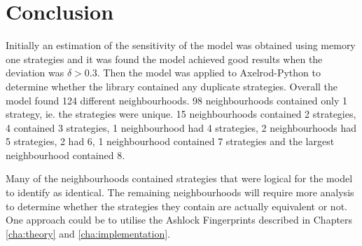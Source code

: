 \section{Conclusion}

Initially an estimation of the sensitivity of the model was obtained using memory one strategies and it was found the model achieved good results when the deviation was $\delta > 0.3$.
Then the model was applied to Axelrod-Python to determine whether the library contained any duplicate strategies.
Overall the model found 124 different neighbourhoods.
98 neighbourhoods contained only 1 strategy, ie. the strategies were unique.
15 neighbourhoods contained 2 strategies, 4 contained 3 strategies, 1 neighbourhood had 4 strategies, 2 neighbourhoods had 5 strategies, 2 had 6, 1 neighbourhood contained 7 strategies and the largest neighbourhood contained 8.

Many of the neighbourhoods contained strategies that were logical for the model to identify as identical.
The remaining neighbourhoods will require more analysis to determine whether the strategies they contain are actually equivalent or not.
One approach could be to utilise the Ashlock Fingerprints described in Chapters \ref{cha:theory} and \ref{cha:implementation}.
